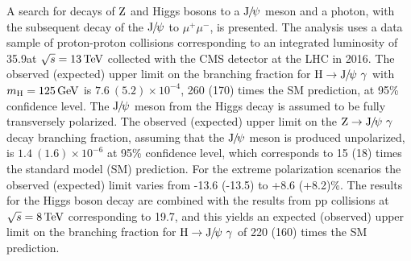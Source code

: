 % 
% 
%
A search for decays of $\mathrm{Z}$ and Higgs bosons to a ${\mathrm{J}\hspace{-.08em}/\hspace{-.14em}\psi}$ meson and a photon, with the subsequent decay of the ${\mathrm{J}\hspace{-.08em}/\hspace{-.14em}\psi}$ to $\mu^{+}\mu^{-}$, is presented. The analysis uses a data sample of proton-proton collisions corresponding to an integrated luminosity of 35.9\fbinv at $\sqrt{s}=13\,\text{Te\hspace{-.08em}V}$ collected with the CMS detector at the LHC in 2016. The observed (expected) upper limit on the branching fraction for $\PH\to\JPsi\ \gamma$ with $m_{\mathrm{H}} = 125\,\text{Ge\hspace{-.08em}V}$ is $7.6\ (5.2)\times 10^{-4}$, 260 (170) times the SM prediction, at 95\% confidence level. The ${\mathrm{J}\hspace{-.08em}/\hspace{-.14em}\psi}$ meson from the Higgs decay is assumed to be fully transversely polarized. The observed (expected) upper limit on the $\mathrm{Z}\to{\mathrm{J}\hspace{-.08em}/\hspace{-.14em}\psi}\ \gamma$ decay branching fraction, assuming that the ${\mathrm{J}\hspace{-.08em}/\hspace{-.14em}\psi}$ meson is produced unpolarized, is $1.4\ (1.6)\times10^{-6}$ at 95\% confidence level, which corresponds to 15 (18) times the standard model (SM) prediction. For the extreme polarization scenarios the observed (expected) limit varies from -13.6 (-13.5) to +8.6 (+8.2)\%. The results for the Higgs boson decay are combined with the results from pp collisions at $\sqrt{s}=8\,\text{Te\hspace{-.08em}V}$ corresponding to 19.7\fbinv, and this yields an expected (observed) upper limit on the branching fraction for $\PH\to\JPsi\ \gamma$ of 220 (160) times the SM prediction.
